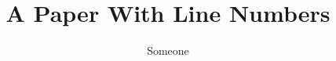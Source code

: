 \documentclass[10pt]{article}
\begin{document}
\title{A Paper With Line Numbers}\author{Someone}\maketitle
\lipsum[1-12]
\end{document}

